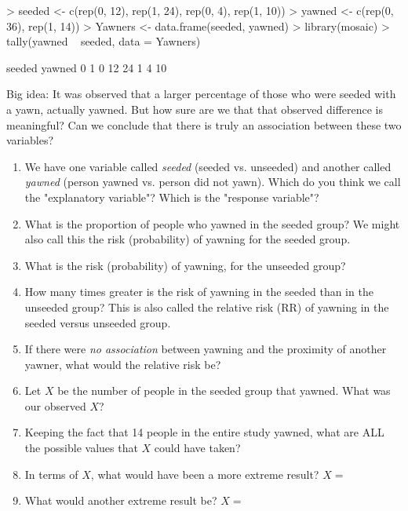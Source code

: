 \documentclass[10pt]{article}
\begin{document}
\begin{Schunk}
\begin{Sinput}
> seeded <- c(rep(0, 12), rep(1, 24), rep(0, 4), rep(1, 10))
> yawned <- c(rep(0, 36), rep(1, 14))
> Yawners <- data.frame(seeded, yawned)
> library(mosaic)
> tally(yawned ~ seeded, data = Yawners)
\end{Sinput}
\begin{Soutput}
      seeded
yawned  0  1
     0 12 24
     1  4 10
\end{Soutput}
\end{Schunk}


Big idea: It was observed that a larger percentage of those who were seeded with a yawn, actually yawned. But how sure are we that that observed difference is meaningful? Can we conclude that there is truly an association between these two variables?  

\begin{enumerate}
  \itemsep2cm
  \item We have one variable called \emph{seeded} (seeded vs. unseeded) and another called \emph{yawned} (person yawned vs. person did not yawn). Which do you think we call the "explanatory variable"?  Which is the "response variable"? 
  \item What is the proportion of people who yawned in the seeded group? We might also call this the risk (probability) of yawning for the seeded group.
  \item What is the risk (probability) of yawning, for the unseeded group?
  \item How many times greater is the risk of yawning in the seeded than in the unseeded group? This is also called the relative risk (RR) of yawning in the seeded versus unseeded group.
  \item If there were \emph{no association} between yawning and the proximity of another yawner, what would the relative risk be?
  \item Let $X$ be the number of people in the seeded group that yawned. What was our observed $X$?
  \item Keeping the fact that 14 people in the entire study yawned, what are ALL the possible values that $X$ could have taken?
  \item In terms of $X$, what would have been a more extreme result?  $X = $
  \item What would another extreme result be?  $X = $
\end{enumerate}

\newpage
\end{document}

